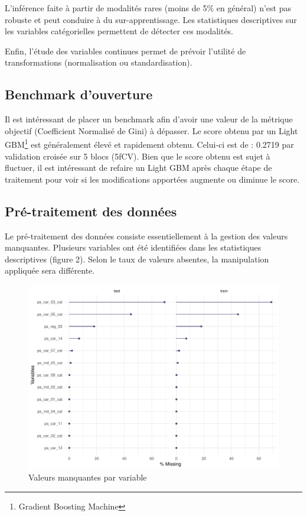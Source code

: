 \documentclass[french]{article}
\begin{document}
\begin{multicols}{2}
L'inférence faite à partir de modalités rares (moins de 5\% en général) n'est pas robuste et peut conduire à du sur-apprentissage. Les statistiques descriptives sur les variables catégorielles permettent de détecter ces modalités.

Enfin, l'étude des variables continues permet de prévoir l'utilité de transformations (normalisation ou standardisation).

\subsection{Benchmark d'ouverture}

Il est intéressant de placer un benchmark afin d'avoir une valeur de la métrique objectif (Coefficient Normalisé de Gini) à dépasser. Le score obtenu par un Light GBM\footnote{Gradient Boosting Machine} est généralement élevé et rapidement obtenu. Celui-ci est de : 0.2719 par validation croisée sur 5 blocs (5fCV). Bien que le score obtenu est sujet à fluctuer, il est intéressant de refaire un Light GBM après chaque étape de traitement pour voir si les modifications apportées augmente ou diminue le score.


\subsection{Pré-traitement des données}

Le pré-traitement des données consiste essentiellement à la gestion des valeurs manquantes. Plusieurs variables ont été identifiées dans les statistiques descriptives (figure 2). Selon le taux de valeurs absentes, la manipulation appliquée sera différente. 

\begin{figure}[H] \centering
  \includegraphics[width = \columnwidth]{img/missing_values}
  \caption{Valeurs manquantes par variable}
\end{figure}



\end{multicols}
\end{document}
